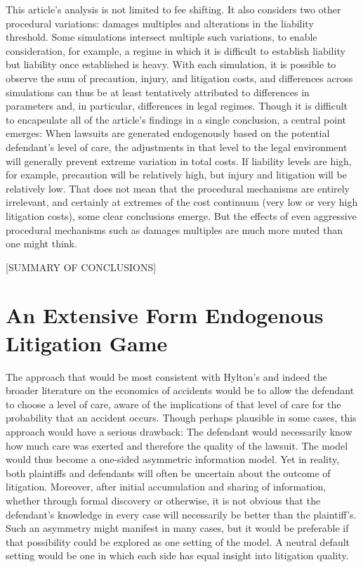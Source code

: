 \documentclass{article}
\begin{document}
This article's analysis is not limited to fee shifting. It also considers two other procedural variations: damages multiples and alterations in the liability threshold. Some simulations intersect multiple such variations, to enable consideration, for example, a regime in which it is difficult to establish liability but liability once established is heavy. With each simulation, it is possible to observe the sum of precaution, injury, and litigation costs, and differences across simulations can thus be at least tentatively attributed to differences in parameters and, in particular, differences in legal regimes. Though it is difficult to encapsulate all of the article's findings in a single conclusion, a central point emerges: When lawsuits are generated endogenously based on the potential defendant's level of care, the adjustments in that level to the legal environment will generally prevent extreme variation in total costs. If liability levels are high, for example, precaution will be relatively high, but injury and litigation will be relatively low. That does not mean that the procedural mechanisms are entirely irrelevant, and certainly at extremes of the cost continuum (very low or very high litigation costs), some clear conclusions emerge. But the effects of even aggressive procedural mechanisms such as damages multiples are much more muted than one might think. 

[SUMMARY OF CONCLUSIONS]

\section{An Extensive Form Endogenous Litigation Game}

The approach that would be most consistent with Hylton's and indeed the broader literature on the economics of accidents would be to allow the defendant to choose a level of care, aware of the implications of that level of care for the probability that an accident occurs. Though perhaps plausible in some cases, this approach would have a serious drawback: The defendant would necessarily know how much care was exerted and therefore the quality of the lawsuit. The model would thus become a one-sided asymmetric information model. Yet in reality, both plaintiffs and defendants will often be uncertain about the outcome of litigation. Moreover, after initial accumulation and sharing of information, whether through formal discovery or otherwise, it is not obvious that the defendant's knowledge in every case will necessarily be better than the plaintiff's. Such an asymmetry might manifest in many cases, but it would be preferable if that possibility could be explored as one setting of the model. A neutral default setting would be one in which each side has equal insight into litigation quality. 
\end{document}
